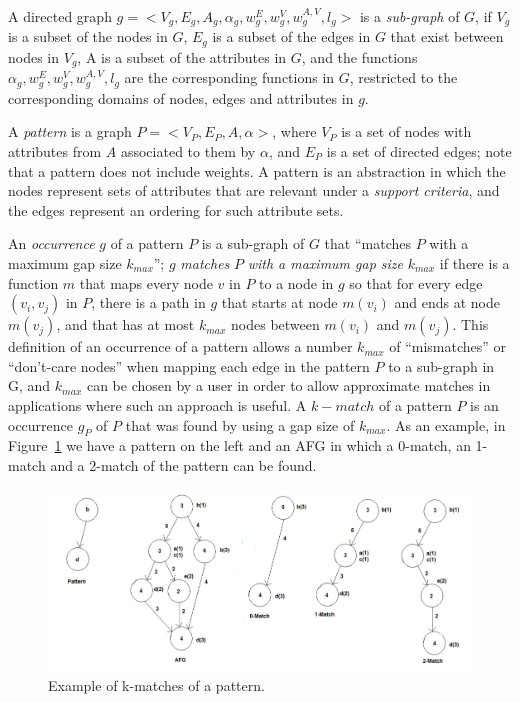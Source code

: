 A directed graph $g = <V_g, E_g, A_g, \alpha_g, w_g^E, w_g^V, w_g^{A,V}, l_g>$ is a \emph{sub-graph} of $G$, if $V_g$ is a subset of the nodes in $G$, $E_g$ is a subset of the edges in $G$ that exist between nodes in $V_g$, A is a subset of the attributes in $G$, and the functions $\alpha_g, w_g^E, w_g^V, w_g^{A,V}, l_g$ are the corresponding functions in $G$, restricted to the corresponding domains of nodes, edges and attributes in $g$. 

A \emph{pattern} is a graph $P = <V_P, E_P, A, \alpha>$, where $V_P$ is a set of nodes with attributes from $A$ associated to them by $\alpha$, and $E_P$ is a set of directed edges; note that a pattern does not include weights.  A pattern is an abstraction in which the nodes represent sets of attributes that are relevant under a \emph{support criteria}, and the edges represent an ordering for such attribute sets.

An \emph{occurrence} $g$ of a pattern $P$ is a sub-graph of $G$ that ``matches $P$ with a maximum gap size $k_{max}$''; $g$ \emph{matches} $P$ \emph{with a maximum gap size} $k_{max}$ if there is a function $m$ that maps every node $v$ in $P$ to a node in $g$ so that for every edge $(v_i, v_j)$ in $P$, there is a path in $g$ that starts at node $m(v_i)$ and ends at node $m(v_j)$, and that has at most $k_{max}$ nodes between $m(v_i)$ and $m(v_j)$. This definition of an occurrence of a pattern allows a number $k_{max}$ of ``mismatches'' or ``don't-care nodes'' when mapping each edge in the pattern $P$ to a sub-graph in G, and $k_{max}$ can be chosen by a user in order to allow approximate matches in applications where such an approach is useful. A $k-match$ of a pattern $P$ is an occurrence $g_P$ of $P$ that was found by using a gap size of $k_{max}$. As an example, in Figure~\ref{fig:GapExample} we have a pattern on the left and an AFG in which a 0-match, an 1-match and a 2-match of the pattern can be found. 

\begin{figure}[h!]
\centering
      \includegraphics[scale=0.25]{figures/match_example.pdf}
    \caption{Example of k-matches of a pattern.}
    \label{fig:GapExample}  
\end{figure}

